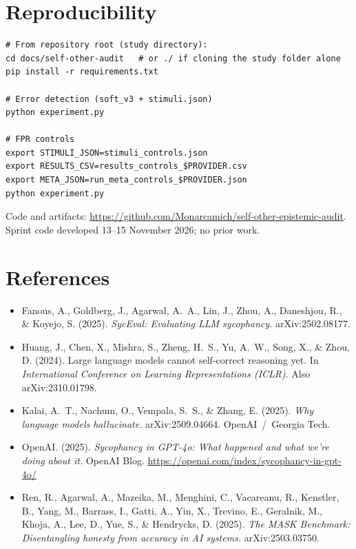 \documentclass[11pt]{article}
\begin{document}
\section{Reproducibility}
\begin{verbatim}
# From repository root (study directory):
cd docs/self-other-audit   # or ./ if cloning the study folder alone
pip install -r requirements.txt

# Error detection (soft_v3 + stimuli.json)
python experiment.py

# FPR controls
export STIMULI_JSON=stimuli_controls.json
export RESULTS_CSV=results_controls_$PROVIDER.csv
export META_JSON=run_meta_controls_$PROVIDER.json
python experiment.py
\end{verbatim}
Code and artifacts:
\url{https://github.com/Monarcamich/self-other-epistemic-audit}.
Sprint code developed 13--15 November 2026; no prior work.

\section*{References}
\begin{itemize}[leftmargin=1.2em,itemsep=0.35em]
  \item Fanous, A., Goldberg, J., Agarwal, A.~A., Lin, J., Zhou, A., Daneshjou, R., \& Koyejo, S. (2025).
        \emph{SycEval: Evaluating LLM sycophancy.} arXiv:2502.08177.
  \item Huang, J., Chen, X., Mishra, S., Zheng, H.~S., Yu, A.~W., Song, X., \& Zhou, D. (2024).
        Large language models cannot self-correct reasoning yet.
        In \emph{International Conference on Learning Representations (ICLR)}. Also arXiv:2310.01798.
  \item Kalai, A.~T., Nachum, O., Vempala, S.~S., \& Zhang, E. (2025).
        \emph{Why language models hallucinate.} arXiv:2509.04664. OpenAI~/~Georgia Tech.
  \item OpenAI. (2025).
        \emph{Sycophancy in GPT-4o: What happened and what we're doing about it.} OpenAI Blog.
        \url{https://openai.com/index/sycophancy-in-gpt-4o/}
  \item Ren, R., Agarwal, A., Mazeika, M., Menghini, C., Vacareanu, R., Kenstler, B., Yang, M., Barrass, I.,
        Gatti, A., Yin, X., Trevino, E., Geralnik, M., Khoja, A., Lee, D., Yue, S., \& Hendrycks, D. (2025).
        \emph{The MASK Benchmark: Disentangling honesty from accuracy in AI systems.} arXiv:2503.03750.
\end{itemize}
\end{document}

